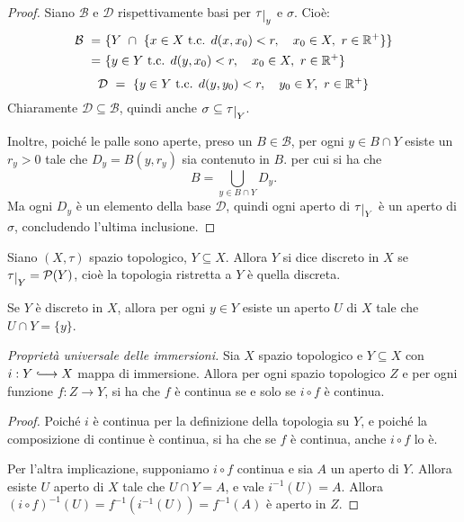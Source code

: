 \begin{proof}
    Siano $\mathcal{B}$ e $\mathcal{D}$ rispettivamente basi per
    $\tau\restrict{y}$ e $\sigma$. Cio\`e:
    \begin{align*}
        \mathcal{B}\ =&\ \{Y\ \cap\ \{x \in X \text{ t.c. } d(x, x_0) < r,\quad x_0 \in
        X,\ r \in \mathbb{R}^+\}\}\\
        =&\ \{y \in Y \text{ t.c. } d(y, x_0) < r,\quad x_0 \in X,\ r \in \mathbb{R}^+\}
    \end{align*}
    \[
        \mathcal{D}\ =\ \{y \in Y \text{ t.c. } d(y, y_0) < r,\quad y_0 \in Y,\ r \in
        \mathbb{R}^+\}
    \]
    Chiaramente $\mathcal{D} \subseteq \mathcal{B}$, quindi anche $\sigma
    \subseteq \tau\restrict{Y}$.

    Inoltre, poiché le palle sono aperte, preso un $B \in \mathcal{B}$, per ogni
    $y \in B \cap Y$ esiste un $r_y>0$ tale che $D_y = B(y,r_y)$ sia contenuto
    in $B$. per cui si ha che
    \[
        B = \bigcup_{y \in B \cap Y} D_y.
    \]
    Ma ogni $D_y$ \`e un elemento della base $\mathcal{D}$, quindi ogni aperto
    di $\tau\restrict{Y}$ \`e un aperto di $\sigma$, concludendo l'ultima
    inclusione.
\end{proof}

\begin{defn}
    Siano $(X, \tau)$ spazio topologico, $Y \subseteq X$. Allora $Y$ si dice
    discreto in $X$ se $\tau\restrict{Y} = \mathcal{P}(Y)$, cioè la topologia
    ristretta a $Y$ \`e quella discreta.
\end{defn}

\begin{oss}
    Se $Y$ \`e discreto in $X$, allora per ogni $y \in Y$ esiste un aperto $U$
    di $X$ tale che $U \cap Y = \{y\}$.
\end{oss}

\begin{thm}
    \emph{Proprietà universale delle immersioni.} Sia $X$ spazio topologico e $Y
    \subseteq X$ con $i: Y \hooklongrightarrow X$ mappa di immersione. Allora
    per ogni spazio topologico $Z$ e per ogni funzione $f: Z \longrightarrow Y$,
    si ha che $f$ \`e continua se e solo se $i \circ f$ \`e continua.
\end{thm}

\begin{proof}
    Poiché $i$ \`e continua per la definizione della topologia su $Y$, e poiché
    la composizione di continue \`e continua, si ha che se $f$ \`e continua,
    anche $i \circ f$ lo \`e.

    Per l'altra implicazione, supponiamo $i \circ f$ continua e sia $A$ un
    aperto di $Y$. Allora esiste $U$ aperto di $X$ tale che ${U\cap Y = A}$, e
    vale ${i^{-1}(U) = A}$. Allora $(i\circ f)^{-1}(U) = f^{-1}(i^{-1}(U)) =
    f^{-1}(A)$ \`e aperto in $Z$.
\end{proof}

